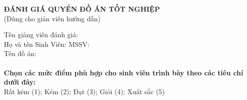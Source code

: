 \documentclass{article}%
\begin{document}
\clearpage
\newpage \pagestyle{empty}
\begin{center}
    \textbf{\fontsize{14pt}{0pt}\selectfont ĐÁNH GIÁ QUYỂN ĐỒ ÁN TỐT NGHIỆP}\\
    \vspace{10pt}
    \fontsize{14pt}{0pt}\selectfont (Dùng cho giản viên hướng dẫn) 
\end{center}
\vspace{14pt}
\fontsize{13pt}{20pt}\selectfont Tên giảng viên đánh giá:\\
\fontsize{13pt}{20pt}\selectfont Họ và tên Sinh Viên:
\hspace{5.5cm}
\fontsize{13pt}{20pt}\selectfont MSSV:\\
\fontsize{13pt}{20pt}\selectfont Tên đồ án:\\
\fontsize{13pt}{20pt}\selectfont \\
\textbf{\fontsize{13pt}{20pt}\selectfont Chọn các mức điểm phù hợp cho sinh viên trình bày theo các tiêu chí dưới đây:}\\
\fontsize{13pt}{20pt}\selectfont Rất kém (1); Kém (2); Đạt (3); Giỏi (4); Xuất sắc (5)
\end{document}
